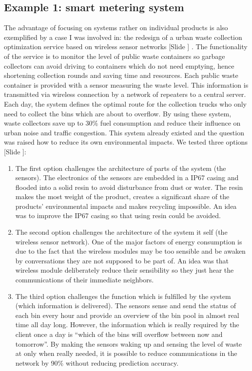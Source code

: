 \documentclass{article}
\newcounter{slide}
\begin{document}
\subsection{Example 1: smart metering system}
\label{sec:smartcity}
The advantage of focusing on systems rather on individual products is also exemplified by a case I was involved in: the redesign of a urban waste collection optimization service based on wireless sensor networks {\color{blue}[Slide ]} \cite{bonvoisinAnalyseEnvironnementaleEcoconception2012}. The functionality of the service is to monitor the level of public waste containers so garbage collectors can avoid driving to containers which do not need emptying, hence shortening collection rounds and saving time and resources. Each public waste container is provided with a sensor measuring the waste level. This information is transmitted via wireless connection by a network of repeaters to a central server. Each day, the system defines the optimal route for the collection trucks who only need to collect the bins which are about to overflow. By using these system, waste collectors save up to 30\% fuel consumption and reduce their influence on urban noise and traffic congestion. This system already existed and the question was raised how to reduce its own environmental impacts. We tested three options {\color{blue}[Slide ]}:
\begin{enumerate}
	\item The first option challenges the architecture of parts of the system (the sensors). The electronics of the sensors are embedded in a IP67 casing and flooded into a solid resin to avoid disturbance from dust or water. The resin makes the most weight of the product, creates a significant share of the products' environmental impacts and makes recycling impossible. An idea was to improve the IP67 casing so that using resin could be avoided.
	\item The second option challenges the architecture of the system it self (the wireless sensor network). One of the major factors of energy consumption is due to the fact that the wireless modules may be too sensible and be awaken by conversations they are not supposed to be part of. An idea was that wireless module deliberately reduce their sensibility so they just hear the communications of their immediate neighbors. 
	\item The third option challenges the function which is fulfilled by the system (which information is delivered). The sensors sense and send the status of each bin every hour and provide an overview of the bin pool in almost real time all day long. However, the information which is really required by the client once a day is ``which of the bins will overflow between now and tomorrow''. By making the sensors waking up and sensing the level of waste at only when really needed, it is possible to reduce communications in the network by 90\% without reducing prediction accuracy.
\end{enumerate}
\end{document}
